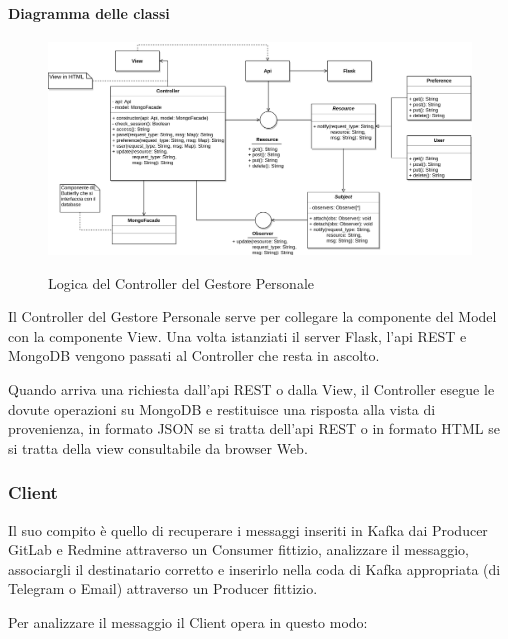     \paragraph{Diagramma delle classi}

    \begin{figure}[H]
        \centering
        \includegraphics[width=\textwidth]{img/GP-View.png}\\
        \caption{Logica del Controller del Gestore Personale}
        \label{fig:GP-View}
    \end{figure}

    Il Controller del Gestore Personale serve per collegare la componente del Model con la componente View.
    Una volta istanziati il server Flask, l'api REST e MongoDB vengono passati al Controller che resta in ascolto.\par
    Quando arriva una richiesta dall'api REST o dalla View, il Controller esegue le dovute operazioni su MongoDB e restituisce una risposta alla vista di provenienza, in formato JSON se si tratta dell'api REST o in formato HTML se si tratta della view consultabile da browser Web.


\subsubsection{Client}
Il suo compito è quello di recuperare i messaggi inseriti in Kafka dai Producer GitLab e Redmine attraverso un Consumer fittizio, analizzare il messaggio, associargli il destinatario corretto e inserirlo nella coda di Kafka appropriata (di Telegram o Email) attraverso un Producer fittizio.

Per analizzare il messaggio il Client opera in questo modo:

